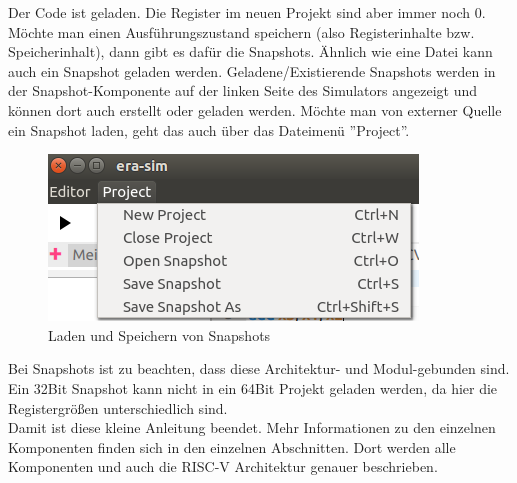 Der Code ist geladen. Die Register im neuen Projekt sind aber immer noch 0.
Möchte man einen Ausführungszustand speichern (also Registerinhalte bzw.
Speicherinhalt), dann gibt es dafür die Snapshots. Ähnlich wie eine Datei kann
auch ein Snapshot geladen werden. Geladene/Existierende Snapshots werden in der
Snapshot-Komponente auf der linken Seite des Simulators angezeigt und können
dort auch erstellt oder geladen werden. Möchte man von externer Quelle ein
Snapshot laden, geht das auch über das Dateimenü ''Project''.
\begin{figure}[H]
	\centering
	\includegraphics[scale=1.0]{Images/first-steps-13.png}
	\caption{Laden und Speichern von Snapshots}
\end{figure}

Bei Snapshots ist zu beachten, dass diese Architektur- und Modul-gebunden sind.
Ein 32Bit Snapshot kann nicht in ein 64Bit Projekt geladen werden, da hier die
Registergrößen unterschiedlich sind.\\

Damit ist diese kleine Anleitung beendet. Mehr Informationen zu den einzelnen
Komponenten finden sich in den einzelnen Abschnitten. Dort werden alle
Komponenten und auch die RISC-V Architektur genauer beschrieben.
